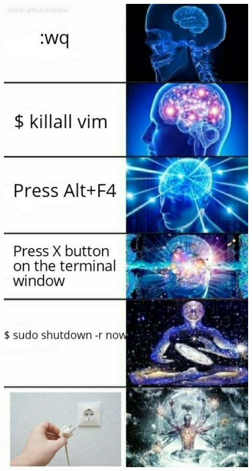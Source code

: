 \documentclass[
]{beamer}
\begin{document}
\begin{frame}
\centering
\includegraphics[height=\textheight]{images/vim2.jpg}
\end{frame}
\end{document}
